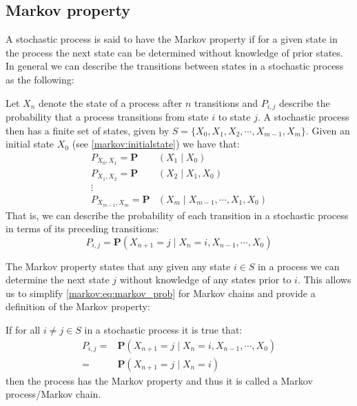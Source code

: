 \subsection{Markov property}\label{markov:property}
A stochastic process is said to have the Markov property if for a given state in the process the next state can be determined without knowledge of prior states.
In general we can describe the transitions between states in a stochastic process as the following:

Let $X_n$ denote the state of a process after $n$ transitions and $P_{i,j}$ describe the probability that a process transitions from state $i$ to state $j$.
A stochastic process then has a finite set of states, given by $S = \{X_0, X_1, X_2,\cdots, X_{m-1}, X_m\}$.
Given an initial state $X_0$ (see \cref{markov:initialstate}) we have that:
\begin{align*}
P_{X_0,X_1} = \mathbf{P}&(X_1 \mid X_0)\\
P_{X_1,X_2} = \mathbf{P}&(X_2 \mid X_1, X_0)\\
\vdots\\
P_{X_{m-1},X_m} = \mathbf{P}&(X_m \mid X_{m-1}, \cdots, X_1, X_0)
\end{align*}
That is, we can describe the probability of each transition in a stochastic process in terms of its preceding transitions:
\begin{equation}\label{markov:eq:stochastic_prob}
P_{i,j} = \mathbf{P}(X_{n+1} = j \mid X_n = i, X_{n-1}, \cdots, X_0)
\end{equation}

The Markov property states that any given any state $i \in S$ in a process we can determine the next state $j$ without knowledge of any states prior to $i$.
This allows us to simplify \cref{markov:eq:markov_prob} for Markov chains and provide a definition of the Markov property:

If for all $i \neq j \in S$ in a stochastic process it is true that:
\begin{align}\label{markov:eq:markov_prob}
P_{i,j} = &\mathbf{P}(X_{n+1} = j \mid X_n = i, X_{n-1}, \cdots, X_0) \nonumber\\
        = &\mathbf{P}(X_{n+1} = j \mid X_n = i)
\end{align}
then the process has the Markov property and thus it is called a Markov process/Markov chain.



